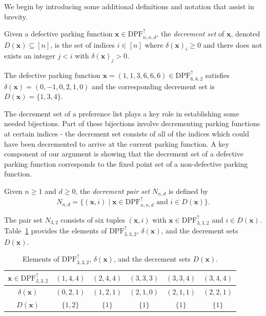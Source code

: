 \documentclass[11pt,reqno]{BICA}
\theoremstyle{definition}
\newcommand{\NDDPF}{\mathrm{DPF}^\uparrow}
\newcommand{\x}{\mathbf{x}}
\newcommand{\pairset}{decrement pair set}
\begin{document}
We begin by introducing some additional definitions and notation that assist in brevity.

\begin{definition}\label{def:decset}
    Given a defective parking function $\x \in \NDDPF_{n, n, d}$, the \textit{decrement set} of $\x$, denoted $D(\x) \subseteq [n]$, is the set of indices $i\in[n]$ where $\delta(\x)_i \geq 0$ and there does not exists an integer $j < i$ with $\delta(\x)_j > 0$.
\end{definition}


\begin{example}
    The defective parking function $\x = (1, 1, 3, 6, 6, 6) \in \NDDPF_{6, 6,2}$ satisfies
$    \delta(\x)=(0,-1,0,2,1,0)$ and the corresponding decrement set is $D(\x) = \{1, 3, 4\}$.
\end{example}



The decrement set of a preference list plays a key role in establishing some needed bijections. Part of these bijections involve decrementing parking functions at certain indices - the decrement set consists of all of the indices which could have been decremented to arrive at the current parking function. A key component of our argument is showing that the decrement set of a defective parking function corresponds to the fixed point set of a non-defective parking function.

\begin{definition}
    Given $n\geq 1$ and  $d\geq 0$, the \emph{\pairset}
    $N_{n, d}$ is defined by
    \[N_{n, d} = \{(\x, i) \mid \x\in \NDDPF_{n,n,d}\mbox{ and } i \in D(\x)\}.\]
\end{definition}


\begin{example}
The pair set $N_{3,2}$ consists of six tuples $(\x,i)$ with $\x\in\NDDPF_{3,3,2}$ and $i\in D(\x)$. Table~\ref{tab:example n=m=3, d=2} provides the elements of $\NDDPF_{3,3,2}$, $\delta(\x)$, and the decrement sets $D(\x)$.
\begin{table}[ht]
    \centering

    \begin{tabular}{|c||c|c|c|c|c|}\hline
        $\x\in\NDDPF_{3,3,2}$ &$(1,4,4)$&$(2,4,4)$&$(3,3,3)$&$(3,3,4)$&$(3,4,4)$\\\hline
$\delta(\x)$			   &$(0,2,1)$&$(1,2,1)$&$(2,1,0)$&$(2,1,1)$&$(2,2,1)$	\\\hline
        $D(\x)$  			   &$\{1,2\}$ &$\{1\}$		&$\{1\}$&$\{1\}$&$\{1\}$		\\\hline
    \end{tabular}


    \caption{Elements of $\NDDPF_{3,3,2}$, $\delta(\x)$, and the decrement sets $D(\x)$.}
    \label{tab:example n=m=3, d=2}
\end{table}
\end{example}
\end{document}
